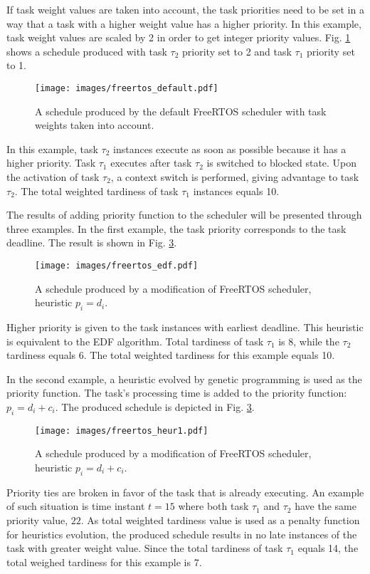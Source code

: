 If task weight values are taken into account, the task priorities need to be set in a way that a task with a higher weight value has a higher priority.
In this example, task weight values are scaled by 2 in order to get integer priority values.
Fig. \ref{freertos_def_2} shows a schedule produced with task $\tau_2$ priority set to 2 and task $\tau_1$ priority set to 1. 
\begin{figure}[ht]
    \centering
    \texttt{[image: images/freertos\_default.pdf]}
    \caption{A schedule produced by the default FreeRTOS scheduler with task weights taken into account.}
    \label{freertos_def_2}
\end{figure}
In this example, task $\tau_2$ instances execute as soon as possible because it has a higher priority.
Task $\tau_1$ executes after task $\tau_2$ is switched to blocked state.
Upon the activation of task $\tau_2$, a context switch is performed, giving advantage to task $\tau_2$.
The total weighted tardiness of task $\tau_1$ instances equals 10.

The results of adding priority function to the scheduler will be presented through three examples.
In the first example, the task priority corresponds to the task deadline.
The result is shown in Fig. \ref{freertos_1}. 
\begin{figure}[ht]
    \centering
    \texttt{[image: images/freertos\_edf.pdf]}
    \caption{A schedule produced by a modification of FreeRTOS scheduler, heuristic $p_i = d_i$.}
    \label{freertos_edf}
\end{figure}
Higher priority is given to the task instances with earliest deadline.
This heuristic is equivalent to the EDF algorithm.
Total tardiness of task $\tau_1$ is 8, while the $\tau_2$ tardiness equals 6.
The total weighted tardiness for this example equals 10.

In the second example, a heuristic evolved by genetic programming is used as the priority function.
The task's processing time is added to the priority function: $p_i = d_i + c_i$.
The produced schedule is depicted in Fig. \ref{freertos_1}.
\begin{figure}[ht]
    \centering
    \texttt{[image: images/freertos\_heur1.pdf]}
    \caption{A schedule produced by a modification of FreeRTOS scheduler, heuristic $p_i = d_i + c_i$.}
    \label{freertos_1}
\end{figure}
Priority ties are broken in favor of the task that is already executing.
An example of such situation is time instant $t=15$ where both task $\tau_1$ and $\tau_2$ have the same priority value, $22$.
As total weighted tardiness value is used as a penalty function for heuristics evolution, the produced schedule results in no late instances of the task with greater weight value.
Since the total tardiness of task $\tau_1$ equals 14, the total weighed tardiness for this example is 7.

